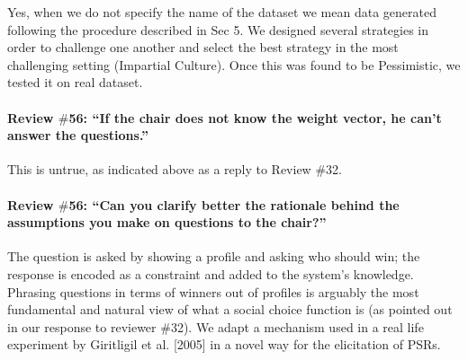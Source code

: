 \documentclass{article}
\begin{document}
Yes, when we do not specify the name of the dataset we mean data generated following the procedure described in Sec 5. We designed several strategies in order to challenge one another and select the best strategy in the most challenging setting (Impartial Culture). Once this was found to be Pessimistic, we tested it on real dataset.

\paragraph{Review $\#$56: “If the chair does not know the weight vector, he can’t answer the questions.”}
This is untrue, as indicated above as a reply to Review \#32.

\paragraph{Review $\#$56: “Can you clarify better the rationale behind the assumptions you make on questions to the chair?”}
The question is asked by showing a profile and asking who should win; the response is encoded as a constraint and added to the system’s knowledge. Phrasing questions in terms of winners out of profiles is arguably the most fundamental and natural view of what a social choice function is (as pointed out in our response to reviewer $\#$32). We adapt a mechanism used in a real life experiment by Giritligil et al. [2005] in a novel way for the elicitation of PSRs.
\end{document}
